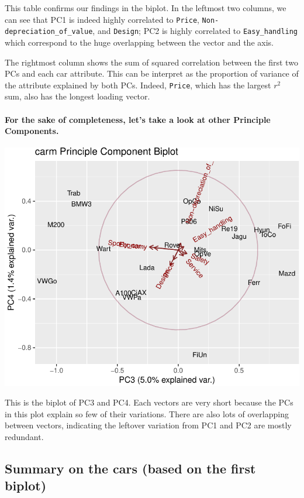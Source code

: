 \documentclass[]{article}
\let\oldparagraph\paragraph
\renewcommand{\paragraph}[1]{\oldparagraph{#1}\mbox{}}
\begin{document}
This table confirms our findings in the biplot. In the leftmost two
columns, we can see that PC1 is indeed highly correlated to
\texttt{Price}, \texttt{Non-depreciation\_of\_value}, and
\texttt{Design}; PC2 is highly correlated to \texttt{Easy\_handling}
which correspond to the huge overlapping between the vector and the
axis.

The rightmost column shows the sum of squared correlation between the
first two PCs and each car attribute. This can be interpret as the
proportion of variance of the attribute explained by both PCs. Indeed,
\texttt{Price}, which has the largest \(r^{2}\) sum, also has the
longest loading vector.

\paragraph{For the sake of completeness, let's take a look at other
Principle
Components.}\label{for-the-sake-of-completeness-lets-take-a-look-at-other-principle-components.}

\begin{center}\includegraphics{Assignment_3_files/figure-latex/unnamed-chunk-10-1} \end{center}

This is the biplot of PC3 and PC4. Each vectors are very short because
the PCs in this plot explain so few of their variations. There are also
lots of overlapping between vectors, indicating the leftover variation
from PC1 and PC2 are mostly redundant.

\subsection{Summary on the cars (based on the first
biplot)}\label{summary-on-the-cars-based-on-the-first-biplot}
\end{document}

